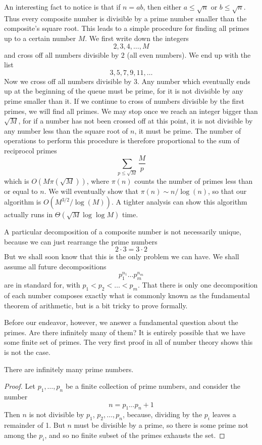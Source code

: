 An interesting fact to notice is that if $n = ab$, then either $a \leq \sqrt{n}$ or $b \leq \sqrt{n}$. Thus every composite number is divisible by a prime number smaller than the composite's square root. This leads to a simple procedure for finding all primes up to a certain number $M$. We first write down the integers
%
\[ 2,3,4,\dots, M \]
%
and cross off all numbers divisible by $2$ (all even numbers). We end up with the list
%
\[ 3,5,7,9,11,\dots \]
%
Now we cross off all numbers divisible by $3$. Any number which eventually ends up at the beginning of the queue must be prime, for it is not divisible by any prime smaller than it. If we continue to cross of numbers divisible by the first primes, we will find all primes. We may stop once we reach an integer bigger than $\sqrt{M}$, for if a number has not been crossed off at this point, it is not divisible by any number less than the square root of $n$, it must be prime. The number of operations to perform this procedure is therefore proportional to the sum of reciprocol primes
%
\[ \sum_{p \leq \sqrt{M}} \frac{M}{p} \]
%
which is $O(M \pi(\sqrt{M}))$, where $\pi(n)$ counts the number of primes less than or equal to $n$. We will eventually show that $\pi(n) \sim n/\log(n)$, so that our algorithm is $O(M^{3/2}/\log(M))$. A tighter analysis can show this algorithm actually runs in $\Theta(\sqrt{M} \log \log M)$ time.

A particular decomposition of a composite number is not necessarily unique, because we can just rearrange the prime numbers
%
\[ 2 \cdot 3 = 3 \cdot 2 \]
%
But we shall soon know that this is the only problem we can have. We shall assume all future decompositions
%
\[ p_1^{n_1} \dots p_m^{n_m} \]
%
are in standard for, with $p_1 < p_2 < \dots < p_m$. That there is only one decomposition of each number composes exactly what is commonly known as the fundamental theorem of arithmetic, but is a bit tricky to prove formally.

Before our endeavor, however, we answer a fundamental question about the primes. Are there infinitely many of them? It is entirely possible that we have some finite set of primes. The very first proof in all of number theory shows this is not the case.

\begin{theorem}[Euclid]
    There are infinitely many prime numbers.
\end{theorem}
\begin{proof}
    Let $p_1, \dots, p_n$ be a finite collection of prime numbers, and consider the number
    \[ n = p_1 \dots p_n + 1 \]
    Then $n$ is not divisible by $p_1$, $p_2, \dots, p_n$, because, dividing by the $p_i$ leaves a remainder of 1. But $n$ must be divisible by a prime, so there is some prime not among the $p_i$, and so no finite subset of the primes exhausts the set.
\end{proof}

